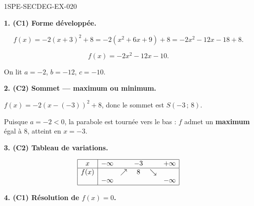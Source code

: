 \begin{corrige}{1SPE-SECDEG-EX-020}


\medskip
\textbf{1. (C1) Forme développée.}


\[f(x) = -2(x+3)^2 + 8 = -2(x^2 + 6x + 9) + 8 = -2x^2 - 12x - 18 + 8.\]

\[\boxed{f(x) = -2x^2 - 12x - 10.}\]

On lit $a = -2$, $b = -12$, $c = -10$.

\medskip
\textbf{2. (C2) Sommet — maximum ou minimum.}


$f(x) = -2(x - (-3))^2 + 8$, donc le sommet est $S(-3\,;\,8)$.

Puisque $a = -2 < 0$, la parabole est tournée vers le bas : $f$ admet un \textbf{maximum} égal à $8$, atteint en $x = -3$.

\medskip
\textbf{3. (C2) Tableau de variations.}


\[
\begin{array}{|c|ccccc|}
\hline
x & -\infty & & -3 & & +\infty \\
\hline
f(x) & & \nearrow & 8 & \searrow & \\
 & -\infty & & & & -\infty \\
\hline
\end{array}
\]

\medskip
\textbf{4. (C1) Résolution de $f(x) = 0$.}


\end{corrige}
